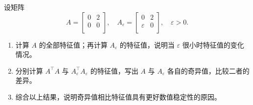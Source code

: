 设矩阵
\[
A = \begin{bmatrix}
    0 & 2 \\
    0 & 0 \\
\end{bmatrix}, \quad A_\varepsilon = \begin{bmatrix}
    0 & 2 \\
    \varepsilon & 0 \\
\end{bmatrix}, \quad \varepsilon > 0.
\]
\begin{enumerate}
    \item 计算 $A$ 的全部特征值；再计算 $A_\varepsilon$ 的特征值，说明当 $\varepsilon$ 很小时特征值的变化情况。
    \item 分别计算 $A^\top A$ 与 $A_\varepsilon^\top A_\varepsilon$ 的特征值，写出 $A$ 与 $A_\varepsilon$ 各自的奇异值，比较二者的差异。
    \item 综合以上结果，说明奇异值相比特征值具有更好数值稳定性的原因。
\end{enumerate}

